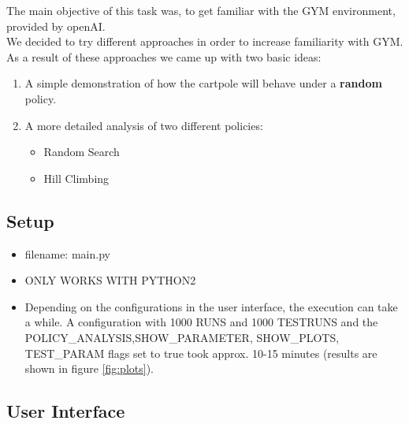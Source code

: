 \documentclass[a4paper, 11pt]{article}
\begin{document}
The main objective of this task was, to get familiar with the GYM environment, provided by openAI. \\
We decided to try different approaches in order to increase familiarity with GYM. As a result of these approaches we came up with two basic ideas:

\begin{enumerate}
	\item A simple demonstration of how the cartpole will behave under a \textbf{random} policy.
	\item A more detailed analysis of two different policies:
	\begin{itemize}
		\item Random Search
		\item Hill Climbing
	\end{itemize}
\end{enumerate}


\subsection{Setup}

\begin{itemize}
	\item filename: main.py
	\item ONLY WORKS WITH PYTHON2
	\item Depending on the configurations in the user interface, the execution can take a while. A configuration with 1000 RUNS and 1000 TESTRUNS and the POLICY\_ANALYSIS,SHOW\_PARAMETER, SHOW\_PLOTS, TEST\_PARAM flags set to true took approx. 10-15 minutes (results are shown in figure \ref{fig:plots}).
\end{itemize}

\subsection{User Interface}
\end{document}
